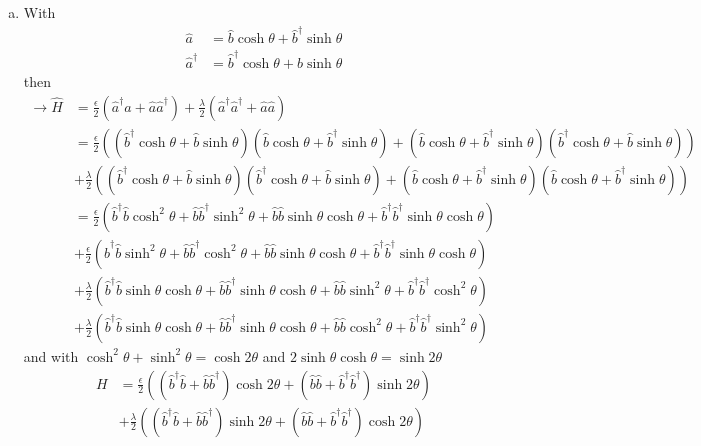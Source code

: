 \documentclass[../main.tex]{subfiles}
\begin{document}
\begin{enumerate}[(a)]
\item With
\begin{align}
\hat{a}&=\hat{b}\cosh\theta+\hat{b}^\dagger\sinh\theta\\
\hat{a}^\dagger&=\hat{b}^\dagger\cosh\theta +\hat{b}\sinh\theta
\end{align}
then
\begin{align}
\rightarrow\hat{H}
&=\frac{\epsilon}{2}(\hat{a}^\dagger\hat{a}+\hat{a}\hat{a}^\dagger)
+\frac{\lambda}{2}(\hat{a}^\dagger\hat{a}^\dagger+\hat{a}\hat{a})\\
&=\frac{\epsilon}{2}\left(
(\hat{b}^\dagger\cosh\theta +\hat{b}\sinh\theta)(\hat{b}\cosh\theta+\hat{b}^\dagger\sinh\theta)
+(\hat{b}\cosh\theta+\hat{b}^\dagger\sinh\theta)(\hat{b}^\dagger\cosh\theta +\hat{b}\sinh\theta)\right)\\
&+\frac{\lambda}{2}\left(
(\hat{b}^\dagger\cosh\theta +\hat{b}\sinh\theta)(\hat{b}^\dagger\cosh\theta +\hat{b}\sinh\theta)+
(\hat{b}\cosh\theta+\hat{b}^\dagger\sinh\theta)(\hat{b}\cosh\theta+\hat{b}^\dagger\sinh\theta)\right)\\
&=\frac{\epsilon}{2}
\left(
\hat{b}^\dagger\hat{b}\cosh^2\theta+
\hat{b}\hat{b}^\dagger\sinh^2\theta+
\hat{b}\hat{b}\sinh\theta\cosh\theta+
\hat{b}^\dagger\hat{b}^\dagger\sinh\theta\cosh\theta
\right)\\
&+\frac{\epsilon}{2}
\left(
\hat{b}^\dagger\hat{b}\sinh^2\theta+
\hat{b}\hat{b}^\dagger\cosh^2\theta+
\hat{b}\hat{b}\sinh\theta\cosh\theta+
\hat{b}^\dagger\hat{b}^\dagger\sinh\theta\cosh\theta
\right)\\
&+\frac{\lambda}{2}
\left(
\hat{b}^\dagger\hat{b}\sinh\theta\cosh\theta+
\hat{b}\hat{b}^\dagger\sinh\theta\cosh\theta+
\hat{b}\hat{b}\sinh^2\theta+
\hat{b}^\dagger\hat{b}^\dagger\cosh^2\theta
\right)\\
&+\frac{\lambda}{2}
\left(
\hat{b}^\dagger\hat{b}\sinh\theta\cosh\theta+
\hat{b}\hat{b}^\dagger\sinh\theta\cosh\theta+
\hat{b}\hat{b}\cosh^2\theta+
\hat{b}^\dagger\hat{b}^\dagger\sinh^2\theta
\right)
\end{align}
and with $\cosh^2\theta+\sinh^2\theta=\cosh2\theta$ and $2\sinh\theta\cosh\theta=\sinh2\theta$
\begin{align}
H&=\frac{\epsilon}{2}\left(
(\hat{b}^\dagger\hat{b}+\hat{b}\hat{b}^\dagger)\cosh2\theta+
(\hat{b}\hat{b}+\hat{b}^\dagger\hat{b}^\dagger)\sinh2\theta
\right)\\
&+\frac{\lambda}{2}\left(
(\hat{b}^\dagger\hat{b}+\hat{b}\hat{b}^\dagger)\sinh2\theta+
(\hat{b}\hat{b}+\hat{b}^\dagger\hat{b}^\dagger)\cosh2\theta
\right)\\

\end{align}
\end{enumerate}
\end{document}

